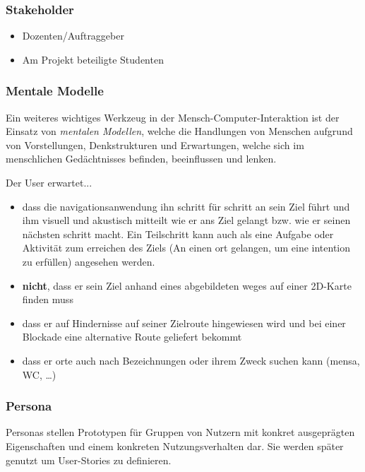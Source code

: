 \subsubsection*{Stakeholder}
\begin{itemize}
  \item Dozenten/Auftraggeber
  \item Am Projekt beteiligte Studenten
\end{itemize}

\subsubsection*{Mentale Modelle}
Ein weiteres wichtiges Werkzeug in der Mensch-\-Computer-\-Interaktion ist der Einsatz von \emph{mentalen Modellen}, welche die Handlungen von Menschen aufgrund von Vorstellungen, Denkstrukturen und Erwartungen, welche sich im menschlichen Gedächtnisses befinden, beeinflussen und lenken.\medskip

\noindent Der User erwartet...
\begin{itemize}
  \item dass die \gls{navigation}sanwendung ihn \gls{schritt} für \gls{schritt} an sein Ziel führt und ihm visuell und akustisch mitteilt wie er ans Ziel gelangt bzw. wie er seinen nächsten \gls{schritt} macht. Ein Teilschritt kann auch als eine Aufgabe oder Aktivität zum erreichen des Ziels (An einen \gls{ort} gelangen, um eine \gls{intention} zu erfüllen) angesehen werden.
  \item \textbf{nicht}, dass er sein Ziel anhand eines abgebildeten \gls{weg}es auf einer 2D-Karte finden muss
  \item dass er auf Hindernisse auf seiner Zielroute hingewiesen wird und bei einer Blockade eine alternative Route geliefert bekommt
  \item dass er \gls{ort}e auch nach Bezeichnungen oder ihrem Zweck suchen kann (\gls{mensa}, WC, \dots)
\end{itemize}

\subsubsection*{Persona}
Personas stellen Prototypen für Gruppen von Nutzern mit konkret ausgeprägten Eigenschaften und einem konkreten Nutzungsverhalten dar. Sie werden später genutzt um User-Stories zu definieren.

